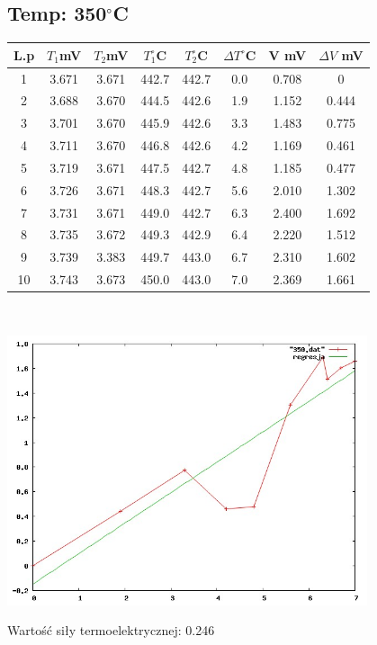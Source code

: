 \documentclass[a4paper,12pt]{article}
\begin{document}
\subsection{Temp: 350$^\circ$C}
\begin{tabular}{|c|c|c|c|c|c|c|c|}
\hline
L.p&$T_1$mV&$T_2$mV&$T_1^\circ$C&$T_2^\circ$C&$\Delta T^\circ$C&V mV&$\Delta V$ mV\\
\hline
1&3.671&3.671&442.7&442.7&0.0&0.708&0\\
2&3.688&3.670&444.5&442.6&1.9&1.152&0.444\\
3&3.701&3.670&445.9&442.6&3.3&1.483&0.775\\
4&3.711&3.670&446.8&442.6&4.2&1.169&0.461\\
5&3.719&3.671&447.5&442.7&4.8&1.185&0.477\\
6&3.726&3.671&448.3&442.7&5.6&2.010&1.302\\
7&3.731&3.671&449.0&442.7&6.3&2.400&1.692\\
8&3.735&3.672&449.3&442.9&6.4&2.220&1.512\\
9&3.739&3.383&449.7&443.0&6.7&2.310&1.602\\
10&3.743&3.673&450.0&443.0&7.0&2.369&1.661\\
\hline
\end{tabular}\\
\begin{center}
\includegraphics[width=400px]{350}
\end{center}

Wartość siły termoelektrycznej: 0.246
\end{document}
